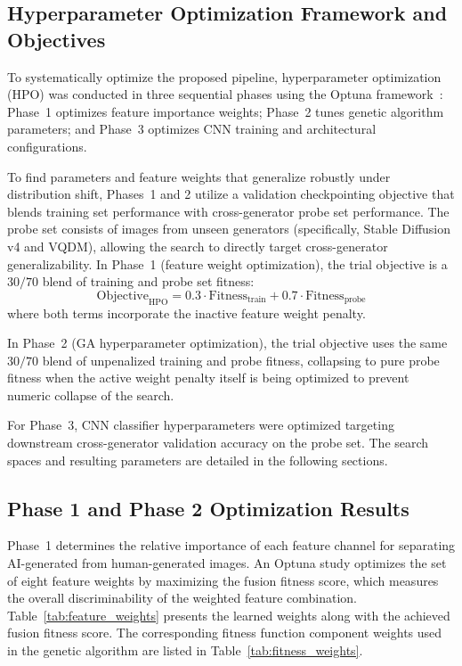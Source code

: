 \documentclass[runningheads]{llncs}
\begin{document}
\subsection{Hyperparameter Optimization Framework and Objectives}

To systematically optimize the proposed pipeline, hyperparameter optimization (HPO) was conducted in three sequential phases using the Optuna framework~\cite{akiba2019optuna}: Phase~1 optimizes feature importance weights; Phase~2 tunes genetic algorithm parameters; and Phase~3 optimizes CNN training and architectural configurations.

To find parameters and feature weights that generalize robustly under distribution shift, Phases~1 and 2 utilize a validation checkpointing objective that blends training set performance with cross-generator probe set performance. The probe set consists of images from unseen generators (specifically, Stable Diffusion v4 and VQDM), allowing the search to directly target cross-generator generalizability. In Phase~1 (feature weight optimization), the trial objective is a $30/70$ blend of training and probe set fitness:
\begin{equation}
\text{Objective}_{\text{HPO}} = 0.3 \cdot \text{Fitness}_{\text{train}} + 0.7 \cdot \text{Fitness}_{\text{probe}}
\end{equation}
where both terms incorporate the inactive feature weight penalty.

In Phase~2 (GA hyperparameter optimization), the trial objective uses the same $30/70$ blend of unpenalized training and probe fitness, collapsing to pure probe fitness when the active weight penalty itself is being optimized to prevent numeric collapse of the search.

For Phase~3, CNN classifier hyperparameters were optimized targeting downstream cross-generator validation accuracy on the probe set. The search spaces and resulting parameters are detailed in the following sections.

\subsection{Phase 1 and Phase 2 Optimization Results}

Phase~1 determines the relative importance of each feature channel for separating AI-generated from human-generated images. An Optuna study optimizes the set of eight feature weights by maximizing the fusion fitness score, which measures the overall discriminability of the weighted feature combination. Table~\ref{tab:feature_weights} presents the learned weights along with the achieved fusion fitness score. The corresponding fitness function component weights used in the genetic algorithm are listed in Table~\ref{tab:fitness_weights}.
\end{document}
